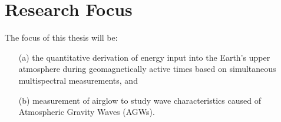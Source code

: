 \section{Research Focus}
The focus of this thesis will be:
\begin{enumerate}
\item[(a)] the quantitative derivation of energy input into the Earth’s upper atmosphere during geomagnetically active times based on simultaneous multispectral measurements, and 
\item[(b)] measurement of airglow to study wave characteristics caused of Atmospheric Gravity Waves (AGWs).
 \end{enumerate} 




